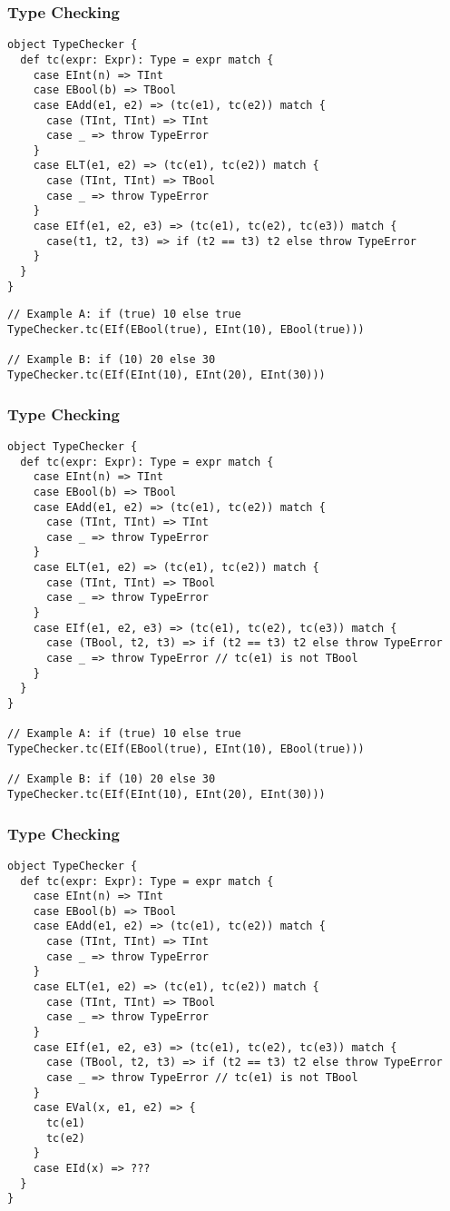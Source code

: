 \documentclass[8pt,pdf]{beamer}
\begin{document}
\begin{frame}[fragile]
\frametitle{Type Checking}

\begin{lstlisting}
object TypeChecker {
  def tc(expr: Expr): Type = expr match {
    case EInt(n) => TInt
    case EBool(b) => TBool
    case EAdd(e1, e2) => (tc(e1), tc(e2)) match {
      case (TInt, TInt) => TInt
      case _ => throw TypeError
    }
    case ELT(e1, e2) => (tc(e1), tc(e2)) match {
      case (TInt, TInt) => TBool
      case _ => throw TypeError
    }
    case EIf(e1, e2, e3) => (tc(e1), tc(e2), tc(e3)) match {
      case(t1, t2, t3) => if (t2 == t3) t2 else throw TypeError
    }
  }
}
\end{lstlisting}
\pause
\begin{lstlisting}
// Example A: if (true) 10 else true
TypeChecker.tc(EIf(EBool(true), EInt(10), EBool(true)))

// Example B: if (10) 20 else 30
TypeChecker.tc(EIf(EInt(10), EInt(20), EInt(30)))
\end{lstlisting}

\end{frame}

\begin{frame}[fragile]
\frametitle{Type Checking}
  
\begin{lstlisting}
object TypeChecker {
  def tc(expr: Expr): Type = expr match {
    case EInt(n) => TInt
    case EBool(b) => TBool
    case EAdd(e1, e2) => (tc(e1), tc(e2)) match {
      case (TInt, TInt) => TInt
      case _ => throw TypeError
    }
    case ELT(e1, e2) => (tc(e1), tc(e2)) match {
      case (TInt, TInt) => TBool
      case _ => throw TypeError
    }
    case EIf(e1, e2, e3) => (tc(e1), tc(e2), tc(e3)) match {
      case (TBool, t2, t3) => if (t2 == t3) t2 else throw TypeError
      case _ => throw TypeError // tc(e1) is not TBool
    }
  }
}

// Example A: if (true) 10 else true
TypeChecker.tc(EIf(EBool(true), EInt(10), EBool(true)))

// Example B: if (10) 20 else 30
TypeChecker.tc(EIf(EInt(10), EInt(20), EInt(30)))
\end{lstlisting}
\end{frame}

\begin{frame}[fragile]
\frametitle{Type Checking}
  
\begin{lstlisting}
object TypeChecker {
  def tc(expr: Expr): Type = expr match {
    case EInt(n) => TInt
    case EBool(b) => TBool
    case EAdd(e1, e2) => (tc(e1), tc(e2)) match {
      case (TInt, TInt) => TInt
      case _ => throw TypeError
    }
    case ELT(e1, e2) => (tc(e1), tc(e2)) match {
      case (TInt, TInt) => TBool
      case _ => throw TypeError
    }
    case EIf(e1, e2, e3) => (tc(e1), tc(e2), tc(e3)) match {
      case (TBool, t2, t3) => if (t2 == t3) t2 else throw TypeError
      case _ => throw TypeError // tc(e1) is not TBool
    }
    case EVal(x, e1, e2) => {
      tc(e1)
      tc(e2)
    }
    case EId(x) => ???
  }
}
\end{lstlisting}
\end{frame}
\end{document}
